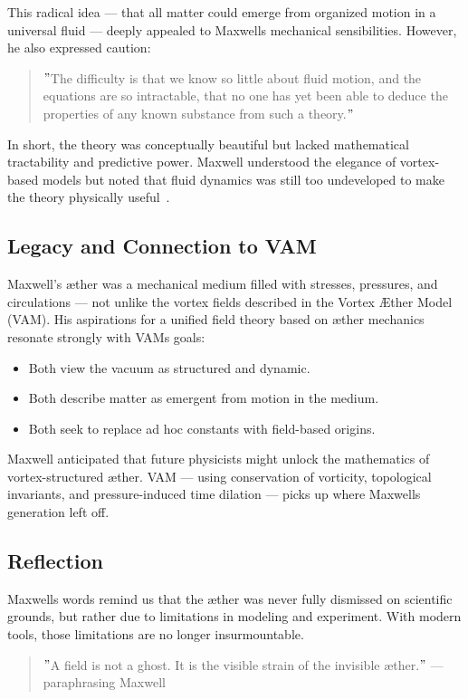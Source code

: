 This radical idea — that all matter could emerge from organized motion in a universal fluid — deeply appealed to Maxwell\rqs s mechanical sensibilities. However, he also expressed caution:

\begin{quote}
\("\)The difficulty is that we know so little about fluid motion, and the equations are so intractable, that no one has yet been able to deduce the properties of any known substance from such a theory.\("\)
\end{quote}

In short, the theory was conceptually beautiful but lacked mathematical tractability and predictive power. Maxwell understood the elegance of vortex-based models but noted that fluid dynamics was still too undeveloped to make the theory physically useful~\cite{maxwell1875molecules}.

\subsection*{Legacy and Connection to VAM}

Maxwell's æther was a mechanical medium filled with stresses, pressures, and circulations — not unlike the vortex fields described in the Vortex Æther Model (VAM). His aspirations for a unified field theory based on æther mechanics resonate strongly with VAM\rqs s goals:

\begin{itemize}
  \item Both view the vacuum as structured and dynamic.
  \item Both describe matter as emergent from motion in the medium.
  \item Both seek to replace ad hoc constants with field-based origins.
\end{itemize}

Maxwell anticipated that future physicists might unlock the mathematics of vortex-structured æther. VAM — using conservation of vorticity, topological invariants, and pressure-induced time dilation — picks up where Maxwell\rqs s generation left off.

\subsection*{Reflection}

Maxwell\rqs s words remind us that the æther was never fully dismissed on scientific grounds, but rather due to limitations in modeling and experiment. With modern tools, those limitations are no longer insurmountable.

\begin{quote}
\("\)A field is not a ghost. It is the visible strain of the invisible æther.\("\) — paraphrasing Maxwell
\end{quote}
